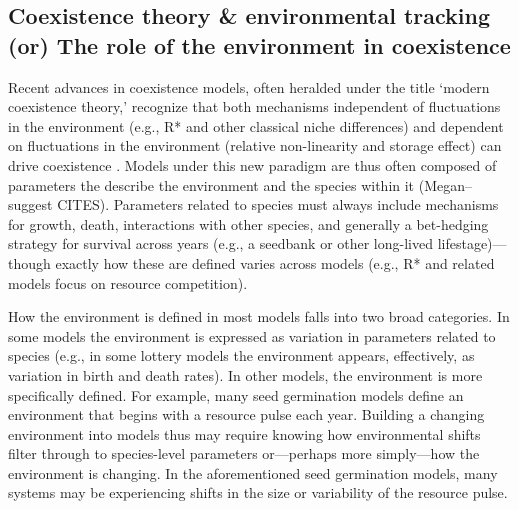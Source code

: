 \documentclass[11pt,letterpaper]{article}
\begin{document}

\subsection{Coexistence theory \& environmental tracking (or) The role of the environment in coexistence} 
Recent advances in coexistence models, often heralded under the title ‘modern coexistence theory,' recognize that both mechanisms independent of fluctuations in the environment (e.g., R* and other classical niche differences) and dependent on fluctuations in the environment (relative non-linearity and storage effect) can drive coexistence \citep{Chesson:1997dz,Chesson:2000vd}. Models under this new paradigm are thus often composed of parameters the describe the environment and the species within it (Megan--suggest CITES). Parameters related to species must always include mechanisms for growth, death, interactions with other species, and generally a bet-hedging strategy for survival across years (e.g., a seedbank or other long-lived lifestage)---though exactly how these are defined varies across models (e.g., R* and related models focus on resource competition). 

How the environment is defined in most models falls into two broad categories. In some models the environment is expressed as variation in parameters related to species (e.g., in some lottery models the environment appears, effectively, as variation in birth and death rates). In other models, the environment is more specifically defined. For example, many seed germination models define an environment that begins with a resource pulse each year. Building a changing environment into models thus may require knowing how environmental shifts filter through to species-level parameters \citep{Tuljapurkar2009} or---perhaps more simply---how the environment is changing. In the aforementioned seed germination models, many systems may be experiencing shifts in the size or variability of the resource pulse. 
\end{document}

